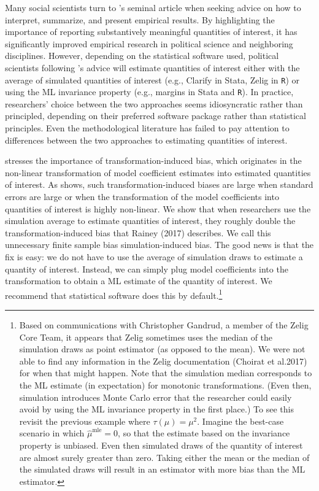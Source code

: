 \documentclass[11pt]{article}
\begin{document}
Many social scientists turn to \cite{KingTomzWittenberg2000}'s seminal article when seeking advice on how to interpret, summarize, and present empirical results.
By highlighting the importance of reporting substantively meaningful quantities of interest, it has significantly improved empirical research in political science and neighboring disciplines.
However, depending on the statistical software used, political scientists following \cite{KingTomzWittenberg2000}'s advice will estimate quantities of interest either with the average of simulated quantities of interest (e.g., Clarify in Stata, Zelig in \texttt{R}) or using the ML invariance property (e.g., margins in Stata and \texttt{R}).
In practice, researchers' choice between the two approaches seems idiosyncratic rather than principled, depending on their preferred software package rather than statistical principles.
Even the methodological literature has failed to pay attention to differences between the two approaches to estimating quantities of interest.


\cite{Rainey2017} stresses the importance of transformation-induced bias, which originates in the non-linear transformation of model coefficient estimates into estimated quantities of interest. As \cite{Rainey2017} shows, such transformation-induced biases are large when standard errors are large or when the transformation of the model coefficients into quantities of interest is highly non-linear. We show that when researchers use the simulation average to estimate quantities of interest, they roughly double the transformation-induced bias that Rainey (2017) describes. We call this unnecessary finite sample bias simulation-induced bias. The good news is that the fix is easy: we do not have to use the average of simulation draws to estimate a quantity of interest. Instead, we can simply plug model coefficients into the transformation to obtain a ML estimate of the quantity of interest. We recommend that statistical software does this by default.\footnote{Based on communications with Christopher Gandrud, a member of the Zelig Core Team, it appears that Zelig sometimes uses the median of the simulation draws as point estimator (as opposed to the mean). We were not able to find any information in the Zelig documentation (Choirat et al.\@ 2017) for when that might happen. Note that the simulation median corresponds to the ML estimate (in expectation) for monotonic transformations. (Even then, simulation introduces Monte Carlo error that the researcher could easily avoid by using the ML invariance property in the first place.) To see this revisit the previous example where $\tau(\mu) = \mu^2.$ Imagine the best-case scenario in which $\hat{\mu}^\text{mle} = 0$, so that the estimate based on the invariance property is unbiased. Even then simulated draws of the quantity of interest are almost surely greater than zero. Taking either the mean or the median of the simulated draws will result in an estimator with more bias than the ML estimator.}
\end{document}
